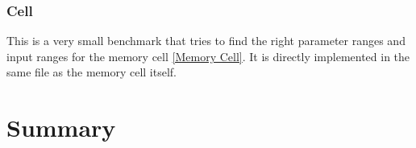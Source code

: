 \documentclass[draft,final]{vutinfth} %
\begin{document}
\subsection{Cell}
This is a very small benchmark that tries to find the right parameter ranges and input ranges for the memory cell \ref{Memory Cell}.
It is directly implemented in the same file as the memory cell itself.
\chapter{Summary}


\backmatter

\listoffigures %

\cleardoublepage %
\listoftables %


\printindex

\printglossaries



\end{document}
